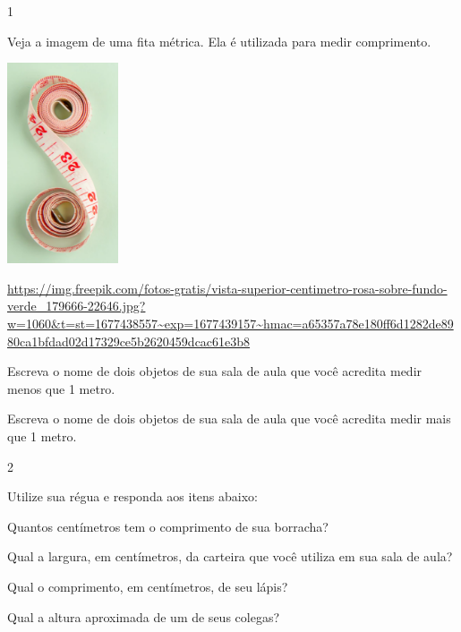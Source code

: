 
\num{1}

Veja a imagem de uma fita métrica. Ela é utilizada para medir
comprimento.

\includegraphics[width=1.29167in,height=2.33463in]{media/image41.png}

\url{https://img.freepik.com/fotos-gratis/vista-superior-centimetro-rosa-sobre-fundo-verde_179666-22646.jpg?w=1060\&t=st=1677438557~exp=1677439157~hmac=a65357a78e180ff6d1282de8980ca1bfdad02d17329ce5b2620459dcac61e3b8}

\begin{escolha}

\item
  Escreva o nome de dois objetos de sua sala de aula que você acredita
  medir menos que 1 metro.

\item
  Escreva o nome de dois objetos de sua sala de aula que você acredita
  medir mais que 1 metro.

\end{escolha}

\num{2}

Utilize sua régua e responda aos itens abaixo:

\begin{escolha}

\item
  Quantos centímetros tem o comprimento de sua borracha?

\item
  Qual a largura, em centímetros, da carteira que você utiliza em sua
  sala de aula?

\item
  Qual o comprimento, em centímetros, de seu lápis?

\item
  Qual a altura aproximada de um de seus colegas?

\end{escolha}

